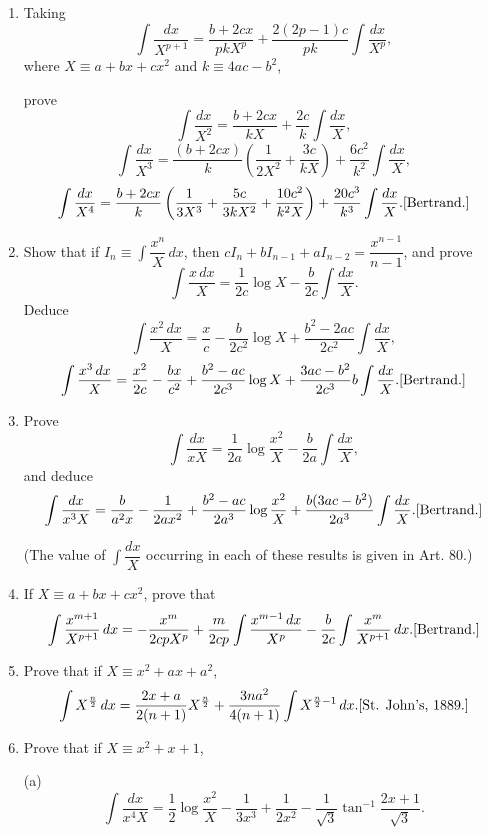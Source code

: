 \documentclass[11pt, a4paper]{article}
\newcommand{\source}[1]{\hfill\textnormal{[#1]}}
\begin{document}
\begin{enumerate}[leftmargin=2em]

\item Taking
\[
\int \dfrac{dx}{X^{p+1}}=\dfrac{b+2cx}{pkX^p}+\dfrac{2(2p-1)c}{pk}\int \dfrac{dx}{X^p},
\]
where $X\equiv a+bx+cx^2$ and $k\equiv4ac-b^2$,

prove
\[
\int \dfrac{dx}{X^2}=\dfrac{b+2cx}{kX}+\dfrac{2c}{k}\int \dfrac{dx}{X},
\]
\[
\int \dfrac{dx}{X^3}=\dfrac{(b+2cx)}{k}\left(\dfrac{1}{2X^2}+\dfrac{3c}{kX}\right)+\dfrac{6c^2}{k^2}\int \dfrac{dx}{X},
\]
\[
\int \dfrac{dx}{X^4}=\dfrac{b+2cx}{k}\left(\dfrac{1}{3X^3}+\dfrac{5c}{3kX^2}+\dfrac{10c^2}{k^2X}\right)+\dfrac{20c^3}{k^3}\int \dfrac{dx}{X}. \source{Bertrand.}
\]

\item Show that if $I_n\equiv\displaystyle\int \dfrac{x^n}{X}\,dx$, then $cI_n+bI_{n-1}+aI_{n-2}=\dfrac{x^{n-1}}{n-1}$, and prove
\[
\int \dfrac{x\,dx}{X}=\dfrac{1}{2c}\log X-\dfrac{b}{2c}\int \dfrac{dx}{X}.
\]
Deduce
\[
\int \dfrac{x^2\,dx}{X}=\dfrac{x}{c}-\dfrac{b}{2c^2}\log X+\dfrac{b^2-2ac}{2c^2}\int \dfrac{dx}{X},
\]
\[
\int \dfrac{x^3\,dx}{X}=\dfrac{x^2}{2c}-\dfrac{bx}{c^2}+\dfrac{b^2-ac}{2c^3}\log X+\dfrac{3ac-b^2}{2c^3}b\int \dfrac{dx}{X}. \source{Bertrand.}
\]

\item Prove
\[
\int \dfrac{dx}{xX}=\dfrac{1}{2a}\log\dfrac{x^2}{X}-\dfrac{b}{2a}\int \dfrac{dx}{X},
\]
and deduce
\[
\int \dfrac{dx}{x^3X}=\dfrac{b}{a^2x}-\dfrac{1}{2ax^2}+\dfrac{b^2-ac}{2a^3}\log\dfrac{x^2}{X}+\dfrac{b(3ac-b^2)}{2a^3}\int \dfrac{dx}{X}. \source{Bertrand.}
\]

(The value of $\displaystyle\int \dfrac{dx}{X}$ occurring in each of these results is given in Art. 80.)

\item If $X\equiv a+bx+cx^2$, prove that
\[
\int \dfrac{x^{m+1}}{X^{p+1}}\,dx=-\dfrac{x^m}{2cpX^p}+\dfrac{m}{2cp}\int \dfrac{x^{m-1}\,dx}{X^p}-\dfrac{b}{2c}\int \dfrac{x^m}{X^{p+1}}\,dx. \source{Bertrand.}
\]

\item Prove that if $X\equiv x^2+ax+a^2$,
\[
\int X^{\frac{n}{2}}\,dx=\dfrac{2x+a}{2(n+1)}X^{\frac{n}{2}}+\dfrac{3na^2}{4(n+1)}\int X^{\frac{n}{2}-1}\,dx. \source{St. John's, 1889.}
\]

\item Prove that if $X\equiv x^2+x+1$,

(a)
\[
\int \dfrac{dx}{x^4X}=\dfrac12\log\dfrac{x^2}{X}-\dfrac{1}{3x^3}+\dfrac{1}{2x^2}-\dfrac{1}{\sqrt3}\tan^{-1}\dfrac{2x+1}{\sqrt3}.
\]


\end{enumerate}
\end{document}
